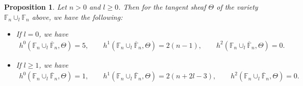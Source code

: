\documentclass[11pt]{article}
\numberwithin{equation}{section}
\newtheorem{Proposition}[Theorem]{Proposition}
{\theoremstyle{definition}
\newtheorem{Definition}[Theorem]{Definition}
\newtheorem{Remark}[Theorem]{Remark}
}
\begin{document}
\begin{Proposition}\label{prop:fd2}
Let $n>0$ and $l\ge 0$.
Then for the tangent sheaf $\Theta$ of the variety $\mathbb{F}_n \cup_l \mathbb{F}_n$ above, we have the following:
\begin{itemize}\itemsep=0pt
\item[$(i)$] If $l=0$, we have
\begin{gather*}
h^0(\mathbb{F}_n \cup_l \overline{\mathbb{F}}_n,\Theta) = 5,
\qquad
h^1(\mathbb{F}_n \cup_l \overline{\mathbb{F}}_n,\Theta) = 2(n-1),
\qquad
h^2(\mathbb{F}_n \cup_l \overline{\mathbb{F}}_n,\Theta) = 0.
\end{gather*}
\item[$(ii)$] If $l\ge 1$, we have
\begin{gather*}
h^0(\mathbb{F}_n \cup_l \overline{\mathbb{F}}_n,\Theta) = 1,
\qquad
h^1(\mathbb{F}_n \cup_l \overline{\mathbb{F}}_n,\Theta) = 2(n+2l-3),
\qquad
h^2(\mathbb{F}_n \cup_l \overline{\mathbb{F}}_n,\Theta) = 0.
\end{gather*}
\end{itemize}
\end{Proposition}
\end{document}
